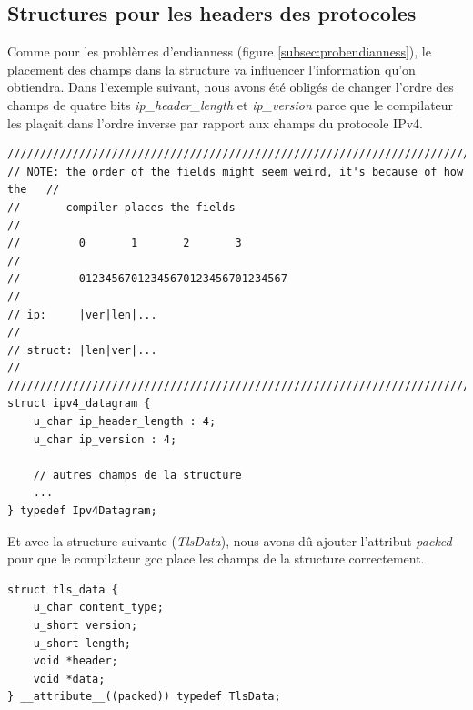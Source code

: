 \documentclass[a4paper]{article}
\begin{document}
\subsection{Structures pour les headers des protocoles}



Comme pour les problèmes d'endianness (figure \ref{subsec:probendianness}), le placement des champs dans la structure va influencer l'information qu'on obtiendra. Dans l'exemple suivant, nous avons été obligés de changer l'ordre des champs de quatre bits \textit{ip\_header\_length} et \textit{ip\_version} parce que le compilateur les plaçait dans l'ordre inverse par rapport aux champs du protocole IPv4.

\begin{lstlisting}[style=CStyle]
///////////////////////////////////////////////////////////////////////////////
// NOTE: the order of the fields might seem weird, it's because of how the   //
//       compiler places the fields                                          //
//         0       1       2       3                                         //
//         01234567012345670123456701234567                                  //
// ip:     |ver|len|...                                                      //
// struct: |len|ver|...                                                      //
///////////////////////////////////////////////////////////////////////////////
struct ipv4_datagram {
    u_char ip_header_length : 4;
    u_char ip_version : 4;

    // autres champs de la structure
    ...
} typedef Ipv4Datagram;
\end{lstlisting}

Et avec la structure suivante (\textit{TlsData}), nous avons dû ajouter l'attribut \textit{packed} pour que le compilateur gcc place les champs de la structure correctement.

\begin{lstlisting}[style=CStyle]
struct tls_data {
    u_char content_type;
    u_short version;
    u_short length;
    void *header;
    void *data;
} __attribute__((packed)) typedef TlsData;
\end{lstlisting}
\end{document}
